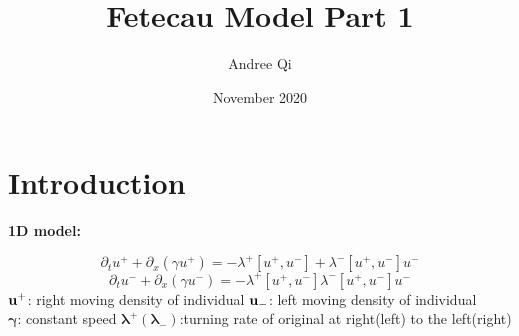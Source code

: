 \documentclass{article}
\title{Fetecau Model Part 1}
\author{Andree Qi }
\date{November 2020}
\begin{document}
\maketitle

\section{Introduction}
\textbf{\large {1D model:}}

$$\partial_tu^++\partial_x(\gamma
u^+)=-\lambda^+[u^+,u^-]+\lambda^-[u^+,u^-]u^-$$ 
$$\partial_tu^-+\partial_x(\gamma
u^-)=-\lambda^+[u^+,u^-]\lambda^-[u^+,u^-]u^-$$
\noindent
$\bold{u^+}$: right moving density of individual  \hspace{1cm} $\bold{u_-}$: left moving density of individual\\
$\boldsymbol{\gamma}$: constant speed   \hspace{1cm} ${\boldsymbol{\lambda^+(\lambda_-)}}$:turning rate of original at right(left) to the left(right)
\end{document}
